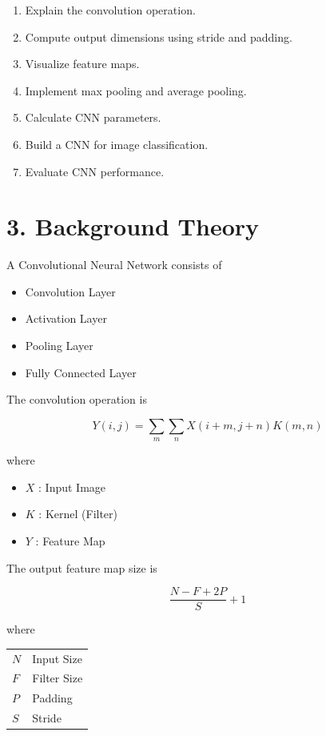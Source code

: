 \documentclass[11pt]{article}
\begin{document}
\begin{enumerate}
\item Explain the convolution operation.
\item Compute output dimensions using stride and padding.
\item Visualize feature maps.
\item Implement max pooling and average pooling.
\item Calculate CNN parameters.
\item Build a CNN for image classification.
\item Evaluate CNN performance.
\end{enumerate}


\section*{3. Background Theory}

A Convolutional Neural Network consists of

\begin{itemize}
\item Convolution Layer
\item Activation Layer
\item Pooling Layer
\item Fully Connected Layer
\end{itemize}

The convolution operation is

\[
Y(i,j)=\sum_m\sum_n X(i+m,j+n)K(m,n)
\]

where

\begin{itemize}
\item $X$ : Input Image
\item $K$ : Kernel (Filter)
\item $Y$ : Feature Map
\end{itemize}

The output feature map size is

\[
\frac{N-F+2P}{S}+1
\]

where

\begin{tabular}{ll}
$N$ & Input Size\\
$F$ & Filter Size\\
$P$ & Padding\\
$S$ & Stride
\end{tabular}
\end{document}
